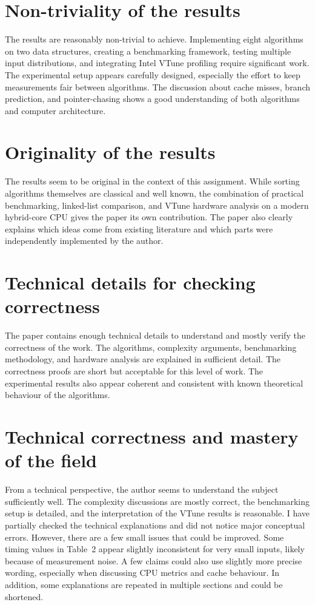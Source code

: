 \documentclass[11pt,a4paper]{article}
\begin{document}
\section{Non-triviality of the results}

The results are reasonably non-trivial to achieve. Implementing eight algorithms on two data structures, creating a benchmarking framework, testing multiple input distributions, and integrating Intel VTune profiling require significant work. The experimental setup appears carefully designed, especially the effort to keep measurements fair between algorithms. The discussion about cache misses, branch prediction, and pointer-chasing shows a good understanding of both algorithms and computer architecture.

\section{Originality of the results}

The results seem to be original in the context of this assignment. While sorting algorithms themselves are classical and well known, the combination of practical benchmarking, linked-list comparison, and VTune hardware analysis on a modern hybrid-core CPU gives the paper its own contribution. The paper also clearly explains which ideas come from existing literature and which parts were independently implemented by the author.

\section{Technical details for checking correctness}

The paper contains enough technical details to understand and mostly verify the correctness of the work. The algorithms, complexity arguments, benchmarking methodology, and hardware analysis are explained in sufficient detail. The correctness proofs are short but acceptable for this level of work. The experimental results also appear coherent and consistent with known theoretical behaviour of the algorithms.

\section{Technical correctness and mastery of the field}

From a technical perspective, the author seems to understand the subject sufficiently well. The complexity discussions are mostly correct, the benchmarking setup is detailed, and the interpretation of the VTune results is reasonable. I have partially checked the technical explanations and did not notice major conceptual errors. However, there are a few small issues that could be improved. Some timing values in Table~2 appear slightly inconsistent for very small inputs, likely because of measurement noise. A few claims could also use slightly more precise wording, especially when discussing CPU metrics and cache behaviour. In addition, some explanations are repeated in multiple sections and could be shortened.
\end{document}
